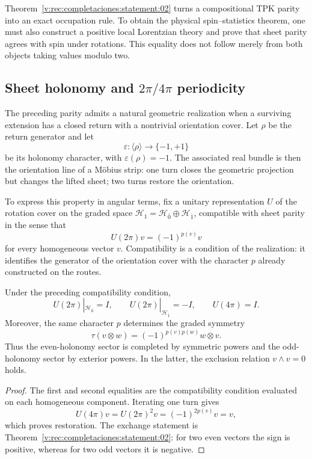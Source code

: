 Theorem~\ref{v:rec:completaciones:statement:02} turns a compositional TPK parity into an exact
occupation rule. To obtain the physical spin--statistics theorem, one must
also construct a positive local Lorentzian theory and prove that
sheet parity agrees with spin under rotations. This equality does not
follow merely from both objects taking values modulo two.

\subsection{Sheet holonomy and \texorpdfstring{\(2\pi/4\pi\)}{2pi/4pi} periodicity}
\label{v:rec:completaciones:section:05}

The preceding parity admits a natural geometric realization when a
surviving extension has a closed return with a nontrivial orientation
cover. Let \(\rho\) be the return generator and let
\[
 \varepsilon:\langle\rho\rangle\longrightarrow\{-1,+1\}
\]
be its holonomy character, with \(\varepsilon(\rho)=-1\). The associated real
bundle is then the orientation line of a Möbius strip: one
turn closes the geometric projection but changes the lifted sheet; two
turns restore the orientation.

To express this property in angular terms, fix a unitary
representation \(U\) of the rotation cover on the graded space
\(\mathcal H_1=\mathcal H_{\bar0}\oplus\mathcal H_{\bar1}\), compatible with
sheet parity in the sense that
\[
 U(2\pi)v=(-1)^{p(v)}v
\]
for every homogeneous vector \(v\). Compatibility is a condition of the
realization: it identifies the generator of the orientation cover with the
character \(p\) already constructed on the routes.

\begin{theorem}
\label{v:rec:thm:dos-cuatro-pi-estadistica}
Under the preceding compatibility condition,
\[
 U(2\pi)|_{\mathcal H_{\bar0}}=I,
 \qquad
 U(2\pi)|_{\mathcal H_{\bar1}}=-I,
 \qquad
 U(4\pi)=I.
\]
Moreover, the same character \(p\) determines the graded symmetry
\[
 \tau(v\otimes w)=(-1)^{p(v)p(w)}w\otimes v.
\]
Thus the even-holonomy sector is completed by symmetric
powers and the odd-holonomy sector by exterior powers. In
the latter, the exclusion relation \(v\wedge v=0\) holds.
\end{theorem}

\begin{proof}
The first and second equalities are the compatibility condition evaluated
on each homogeneous component. Iterating one turn gives
\[
 U(4\pi)v=U(2\pi)^2v=(-1)^{2p(v)}v=v,
\]
which proves restoration. The exchange statement is
Theorem~\ref{v:rec:completaciones:statement:02}: for two even
vectors the sign is positive, whereas for two odd vectors it is negative.
\end{proof}

